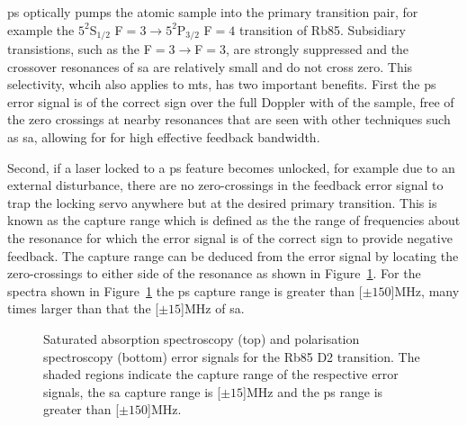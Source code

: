 \Gls{ps} optically pumps the atomic sample into the primary transition pair, for example the $5^2$S$_{1/2}$ F$=3\rightarrow5^2$P$_{3/2}$ F$=4$ transition of Rb85.
Subsidiary transistions, such as the F$=3\rightarrow$F$=3$, are strongly suppressed and the crossover resonances of \gls{sa} are relatively small and do not cross zero.
This selectivity, whcih also applies to \gls{mts}, has two important benefits.
First the \gls{ps} error signal is of the correct sign over the full Doppler with of the sample, free of the zero crossings at nearby resonances that are seen with other techniques such as \gls{sa}, allowing for for high effective feedback bandwidth.

Second, if a laser locked to a \gls{ps} feature becomes unlocked, for example due to an external disturbance, there are no zero-crossings in the feedback error signal to trap the locking servo anywhere but at the desired primary transition.
This is known as the capture range which is defined as the the range of frequencies about the resonance for which the error signal is of the correct sign to provide negative feedback.
The capture range can be deduced from the error signal by locating the zero-crossings to either side of the resonance as shown in Figure~\ref{figure:capture_range}.
For the spectra shown in Figure~\ref{figure:capture_range} the \gls{ps} capture range is greater than \unit[$\pm150$]{MHz}, many times larger than that the \unit[$\pm15$]{MHz} of \gls{sa}.

\begin{figure}
\center

\caption{Saturated absorption spectroscopy (top) and polarisation spectroscopy (bottom) error signals for the Rb85 D2 transition.
The shaded regions indicate the capture range of the respective error signals, the \gls{sa} capture range is \unit[$\pm15$]{MHz} and the \gls{ps} range is greater than \unit[$\pm150$]{MHz}.}
\label{figure:capture_range}
\end{figure}
